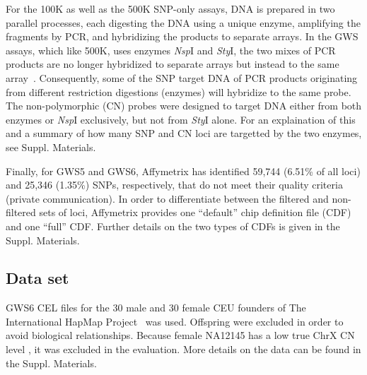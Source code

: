 \documentclass{bioinfo}
\newcommand{\GWSFive}{GWS5\xspace}
\newcommand{\GWSSix}{GWS6\xspace}
\newcommand{\chrX}{ChrX\xspace}
\newcommand{\NspI}{\emph{Nsp}I\xspace}
\newcommand{\StyI}{\emph{Sty}I\xspace}
\begin{document}
For the 100K as well as the 500K SNP-only assays, DNA is prepared in two parallel processes, each digesting the DNA using a unique enzyme, amplifying the fragments by PCR, and hybridizing the products to separate arrays.  In the GWS assays, which like 500K, uses enzymes \NspI and \StyI, the two mixes of PCR products are no longer hybridized to separate arrays but instead to the same array~\citep{Affymetrix_2007f, Affymetrix_2007g}.
Consequently, some of the SNP target DNA of PCR products originating from different restriction digestions (enzymes) will hybridize to the same probe.  
The non-polymorphic (CN) probes were designed to target DNA either from both enzymes or \NspI exclusively, but not from \StyI alone.  
For an explaination of this and a summary of how many SNP and CN loci are targetted by the two enzymes, see Suppl. Materials.


Finally, for \GWSFive and \GWSSix, Affymetrix has identified 59,744 (6.51\% of all loci) and 25,346 (1.35\%) SNPs, respectively, that do not meet their quality criteria (private communication).
In order to differentiate between the filtered and non-filtered sets of loci, Affymetrix provides one ``default'' chip definition file (CDF) and one ``full'' CDF.  Further details on the two types of CDFs is given in the Suppl. Materials.






\subsection{Data set}
\GWSSix CEL files for the 30 male and 30 female CEU founders of The International HapMap Project~\citep{HapMap_2003, AltshulerD_etal_2005} was used. Offspring were excluded in order to avoid biological relationships.
Because female NA12145 has a low true \chrX CN level \citep{TingJ_etal_2006}, it was excluded in the evaluation.  
More details on the data can be found in the Suppl. Materials.
\end{document}
